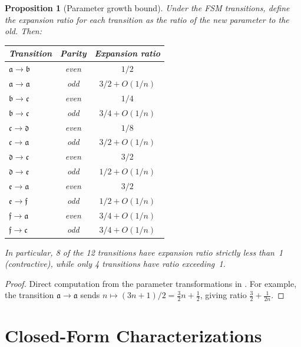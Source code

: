 \documentclass[11pt,a4paper]{article}
\theoremstyle{plain}
\newtheorem{proposition}[theorem]{Proposition}
\theoremstyle{definition}
\begin{document}
\begin{proposition}[Parameter growth bound]\label{prop:growth}
  Under the FSM transitions, define the \emph{expansion ratio} for each transition as the ratio of the new parameter to the old. Then:
  \begin{center}
    \begin{tabular}{lcc}
      \toprule
      \textbf{Transition} & \textbf{Parity} & \textbf{Expansion ratio} \\
      \midrule
      $\mathfrak{a} \to \mathfrak{b}$ & even & $1/2$ \\
      $\mathfrak{a} \to \mathfrak{a}$ & odd & $3/2 + O(1/n)$ \\
      $\mathfrak{b} \to \mathfrak{c}$ & even & $1/4$ \\
      $\mathfrak{b} \to \mathfrak{c}$ & odd & $3/4 + O(1/n)$ \\
      $\mathfrak{c} \to \mathfrak{d}$ & even & $1/8$ \\
      $\mathfrak{c} \to \mathfrak{a}$ & odd & $3/2 + O(1/n)$ \\
      $\mathfrak{d} \to \mathfrak{c}$ & even & $3/2$ \\
      $\mathfrak{d} \to \mathfrak{e}$ & odd & $1/2 + O(1/n)$ \\
      $\mathfrak{e} \to \mathfrak{a}$ & even & $3/2$ \\
      $\mathfrak{e} \to \mathfrak{f}$ & odd & $1/2 + O(1/n)$ \\
      $\mathfrak{f} \to \mathfrak{a}$ & even & $3/4 + O(1/n)$ \\
      $\mathfrak{f} \to \mathfrak{c}$ & odd & $3/4 + O(1/n)$ \\
      \bottomrule
    \end{tabular}
  \end{center}
  In particular, 8 of the 12 transitions have expansion ratio strictly less than~1 (contractive), while only 4 transitions have ratio exceeding~1.
\end{proposition}

\begin{proof}
  Direct computation from the parameter transformations in . For example, the transition $\mathfrak{a} \to \mathfrak{a}$ sends $n \mapsto (3n+1)/2 = \frac{3}{2}n + \frac{1}{2}$, giving ratio $\frac{3}{2} + \frac{1}{2n}$.
\end{proof}

\section{Closed-Form Characterizations}
\label{sec:closed}
\end{document}
